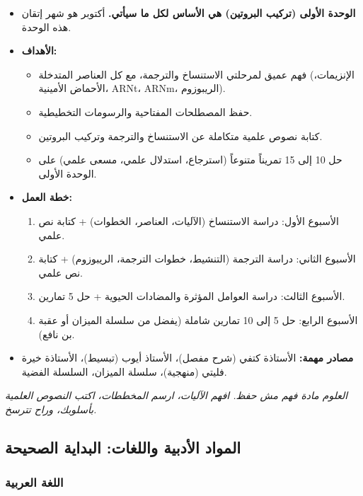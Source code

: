 \documentclass[12pt,a4paper]{book}
\newcommand{\quoteAr}[1]{%
	\begin{myquote}
		\itshape #1
	\end{myquote}
}
\begin{document}
	\begin{itemize}
		\item \textbf{الوحدة الأولى (تركيب البروتين) هي الأساس لكل ما سيأتي.} أكتوبر هو شهر إتقان هذه الوحدة.
		\item \textbf{الأهداف:}
		\begin{itemize}
			\item فهم عميق لمرحلتي الاستنساخ والترجمة، مع كل العناصر المتدخلة (الإنزيمات، الأحماض الأمينية، ARNt، ARNm، الريبوزوم).
			\item حفظ المصطلحات المفتاحية والرسومات التخطيطية.
			\item كتابة نصوص علمية متكاملة عن الاستنساخ والترجمة وتركيب البروتين.
			\item حل 10 إلى 15 تمريناً متنوعاً (استرجاع، استدلال علمي، مسعى علمي) على الوحدة الأولى.
		\end{itemize}
		\item \textbf{خطة العمل:}
		\begin{enumerate}
			\item الأسبوع الأول: دراسة الاستنساخ (الآليات، العناصر، الخطوات) + كتابة نص علمي.
			\item الأسبوع الثاني: دراسة الترجمة (التنشيط، خطوات الترجمة، الريبوزوم) + كتابة نص علمي.
			\item الأسبوع الثالث: دراسة العوامل المؤثرة والمضادات الحيوية + حل 5 تمارين.
			\item الأسبوع الرابع: حل 5 إلى 10 تمارين شاملة (يفضل من سلسلة الميزان أو عقبة بن نافع).
		\end{enumerate}
		\item \textbf{مصادر مهمة:} الأستاذة كتفي (شرح مفصل)، الأستاذ أيوب (تبسيط)، الأستاذة خيرة فليتي (منهجية)، سلسلة الميزان، السلسلة الفضية.
	\end{itemize}
	
	\quoteAr{العلوم مادة فهم مش حفظ. افهم الآليات، ارسم المخططات، اكتب النصوص العلمية بأسلوبك، وراح تترسخ.}
	
	\subsection{المواد الأدبية واللغات: البداية الصحيحة}
	
	\subsubsection{اللغة العربية}
	
\end{document}
